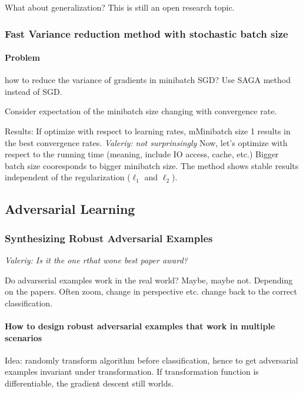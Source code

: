 \documentclass[11pt,oneside,a4paper]{scrartcl}
\newcommand{\valeriy}[1]{{\color{blue}\textit{Valeriy: #1}}}
\begin{document}
What about generalization? This is still an open research topic.

\subsubsection{Fast Variance reduction method with stochastic batch
  size \cite{liu18f}}
\label{sec:fast-vari-reduct}

\paragraph{Problem}
how to reduce the variance of gradients in minibatch SGD?
Use SAGA method instead of SGD.

Consider expectation of the minibatch size changing with convergence rate.
 
Results: If optimize with respect to learning rates, mMinibatch size 1 results in the best convergence rates. \valeriy{not surprinsingly}
Now, let's optimize with respect to the running time (meaning, include
IO access, cache, etc.) Bigger batch size cooresponds to bigger
minibatch size. The method shows stable results independent of the
regularization ($\ell_1$ and $\ell_2$).


\subsection{Adversarial Learning}
\label{sec:adversarial-learning}

\subsubsection{Synthesizing Robust Adversarial Examples}

\valeriy{Is it the one rthat wone best paper award?}

Do advarserial examples work in the real world? Maybe, maybe
not. Depending on the papers. Often zoom, change in perspective
etc. change back to the correct classification.

\paragraph{How to design robust adversarial examples that work in
  multiple scenarios}

Idea: randomly transform algorithm before classification, hence to get
adversarial examples invariant under transformation. If transformation
function is differentiable, the gradient descent still worlds.
\end{document}
